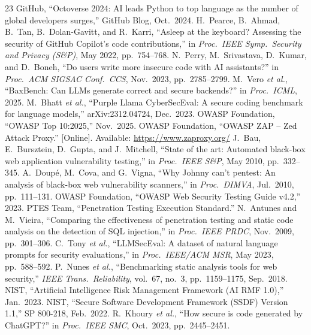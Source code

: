 \documentclass[conference,a4paper]{IEEEtran}
\begin{document}
\begin{thebibliography}{23}
 GitHub, ``Octoverse 2024: AI leads Python to top language as the number of global developers surges,'' GitHub Blog, Oct.\ 2024.
 H.~Pearce, B.~Ahmad, B.~Tan, B.~Dolan-Gavitt, and R.~Karri, ``Asleep at the keyboard? Assessing the security of GitHub Copilot's code contributions,'' in \emph{Proc.\ IEEE Symp.\ Security and Privacy (S\&P)}, May 2022, pp.~754--768.
 N.~Perry, M.~Srivastava, D.~Kumar, and D.~Boneh, ``Do users write more insecure code with AI assistants?'' in \emph{Proc.\ ACM SIGSAC Conf.\ CCS}, Nov.\ 2023, pp.~2785--2799.
 M.~Vero \emph{et al.}, ``BaxBench: Can LLMs generate correct and secure backends?'' in \emph{Proc.\ ICML}, 2025.
 M.~Bhatt \emph{et al.}, ``Purple Llama CyberSecEval: A secure coding benchmark for language models,'' arXiv:2312.04724, Dec.\ 2023.
 OWASP Foundation, ``OWASP Top 10:2025,'' Nov.\ 2025.
 OWASP Foundation, ``OWASP ZAP -- Zed Attack Proxy.'' [Online]. Available: \url{https://www.zaproxy.org/}
 J.~Bau, E.~Bursztein, D.~Gupta, and J.~Mitchell, ``State of the art: Automated black-box web application vulnerability testing,'' in \emph{Proc.\ IEEE S\&P}, May 2010, pp.~332--345.
 A.~Doup\'{e}, M.~Cova, and G.~Vigna, ``Why Johnny can't pentest: An analysis of black-box web vulnerability scanners,'' in \emph{Proc.\ DIMVA}, Jul.\ 2010, pp.~111--131.
 OWASP Foundation, ``OWASP Web Security Testing Guide v4.2,'' 2023.
 PTES Team, ``Penetration Testing Execution Standard.''
 N.~Antunes and M.~Vieira, ``Comparing the effectiveness of penetration testing and static code analysis on the detection of SQL injection,'' in \emph{Proc.\ IEEE PRDC}, Nov.\ 2009, pp.~301--306.
 C.~Tony \emph{et al.}, ``LLMSecEval: A dataset of natural language prompts for security evaluations,'' in \emph{Proc.\ IEEE/ACM MSR}, May 2023, pp.~588--592.
 P.~Nunes \emph{et al.}, ``Benchmarking static analysis tools for web security,'' \emph{IEEE Trans.\ Reliability}, vol.~67, no.~3, pp.~1159--1175, Sep.\ 2018.
 NIST, ``Artificial Intelligence Risk Management Framework (AI RMF 1.0),'' Jan.\ 2023.
 NIST, ``Secure Software Development Framework (SSDF) Version 1.1,'' SP 800-218, Feb.\ 2022.
 R.~Khoury \emph{et al.}, ``How secure is code generated by ChatGPT?'' in \emph{Proc.\ IEEE SMC}, Oct.\ 2023, pp.~2445--2451.

\end{thebibliography}
\end{document}
